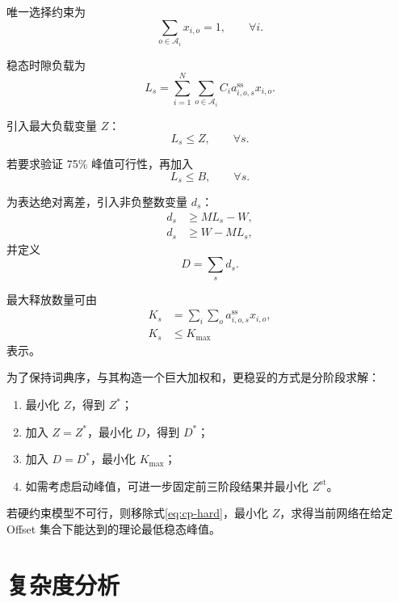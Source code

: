 \documentclass[UTF8,12pt,a4paper]{ctexart}
\newcommand{\Oset}{\mathcal{A}}
\begin{document}
唯一选择约束为
\begin{equation}
 \sum_{o\in\Oset_i}x_{i,o}=1,
 \qquad \forall i.
\label{eq:cp-one}
\end{equation}

稳态时隙负载为
\begin{equation}
 L_s=\sum_{i=1}^{N}\sum_{o\in\Oset_i}
 C_i a^{\mathrm{ss}}_{i,o,s}x_{i,o}.
\label{eq:cp-load}
\end{equation}

引入最大负载变量 $Z$：
\begin{equation}
 L_s\le Z,\qquad \forall s.
\label{eq:cp-z}
\end{equation}

若要求验证 75\% 峰值可行性，再加入
\begin{equation}
 L_s\le B,\qquad \forall s.
\label{eq:cp-hard}
\end{equation}

为表达绝对离差，引入非负整数变量 $d_s$：
\begin{align}
 d_s&\ge M L_s-W,\\
 d_s&\ge W-M L_s,
\end{align}
并定义
\begin{equation}
 D=\sum_s d_s.
\end{equation}

最大释放数量可由
\begin{align}
 K_s&=\sum_i\sum_o a^{\mathrm{ss}}_{i,o,s}x_{i,o},\\
 K_s&\le K_{\max}
\end{align}
表示。

为了保持词典序，与其构造一个巨大加权和，更稳妥的方式是分阶段求解：

\begin{enumerate}
  \item 最小化 $Z$，得到 $Z^*$；
  \item 加入 $Z=Z^*$，最小化 $D$，得到 $D^*$；
  \item 加入 $D=D^*$，最小化 $K_{\max}$；
  \item 如需考虑启动峰值，可进一步固定前三阶段结果并最小化 $Z^{\mathrm{st}}$。
\end{enumerate}

若硬约束模型不可行，则移除式\eqref{eq:cp-hard}，最小化 $Z$，求得当前网络在给定 Offset 集合下能达到的理论最低稳态峰值。

\section{复杂度分析}
\end{document}
